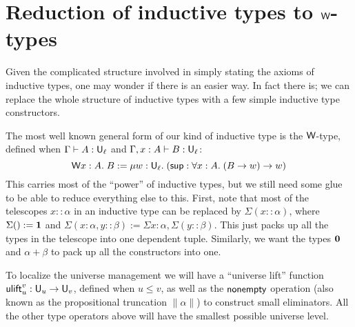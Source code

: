 \section{Reduction of inductive types to $\mathsf{W}$-types}

Given the complicated structure involved in simply stating the axioms of inductive types, one may wonder if there is an easier way. In fact there is; we can replace the whole structure of inductive types with a few simple inductive type constructors.

The most well known general form of our kind of inductive type is the $\mathsf{W}$-type, defined when $\Gamma\vdash A:\U_\ell$ and $\Gamma,x:A\vdash B:\U_\ell$:
$$\mathsf{W} x:A.\;B:=\mu w:\mathsf{U}_\ell.\;(\mathsf{sup}:\forall x:A.\;(B\to w)\to w)$$
This carries most of the ``power'' of inductive types, but we still need some glue to be able to reduce everything else to this. First, note that most of the telescopes $x::\alpha$ in an inductive type can be replaced by $\Sigma(x::\alpha)$, where $\Sigma ():=\bf 1$ and $\Sigma (x:\alpha,y::\beta):=\Sigma x:\alpha,\Sigma(y::\beta)$. This just packs up all the types in the telescope into one dependent tuple. Similarly, we want the types $\bf 0$ and $\alpha+\beta$ to pack up all the constructors into one.

To localize the universe management we will have a ``universe lift'' function $\mathsf{ulift}_u^v:\mathsf{U}_u\to\mathsf{U}_v$, defined when $u\le v$, as well as the $\mathsf{nonempty}$ operation (also known as the propositional truncation $\|\alpha\|$) to construct small eliminators. All the other type operators above will have the smallest possible universe level.

